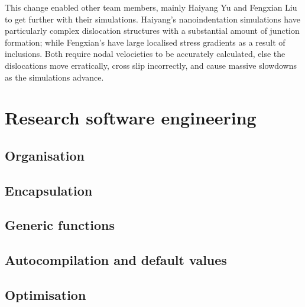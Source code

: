 This change enabled other team members, mainly Haiyang Yu and Fengxian Liu to get further with their simulations. Haiyang's nanoindentation simulations have particularly complex dislocation structures with a substantial amount of junction formation; while Fengxian's have large localised stress gradients as a result of inclusions. Both require nodal velocieties to be accurately calculated, else the dislocations move erratically, cross slip incorrectly, and cause massive slowdowns as the simulations advance.

\section{Research software engineering}
\subsection{Organisation}
\subsection{Encapsulation}
\subsection{Generic functions}
\subsection{Autocompilation and default values}
\subsection{Optimisation}

